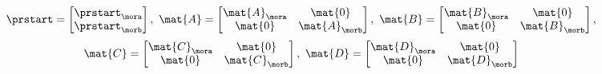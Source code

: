 \begin{equation}\label{eq:LTI-stacking-mor1}
    \prstart=\begin{bmatrix}
        \prstart_\mora \\
        \prstart_\morb
    \end{bmatrix},\
    \mat{A}=\begin{bmatrix}
        \mat{A}_\mora & \mat{0}       \\
        \mat{0}       & \mat{A}_\morb
    \end{bmatrix},\
    \mat{B}=\begin{bmatrix}
        \mat{B}_\mora & \mat{0}       \\
        \mat{0}       & \mat{B}_\morb
    \end{bmatrix},
\end{equation}
\begin{equation}\label{eq:LTI-stacking-mor2}
    \mat{C}=\begin{bmatrix}
        \mat{C}_\mora & \mat{0}       \\
        \mat{0}       & \mat{C}_\morb
    \end{bmatrix},\
    \mat{D}=\begin{bmatrix}
        \mat{D}_\mora & \mat{0}       \\
        \mat{0}       & \mat{D}_\morb
    \end{bmatrix}
\end{equation}


